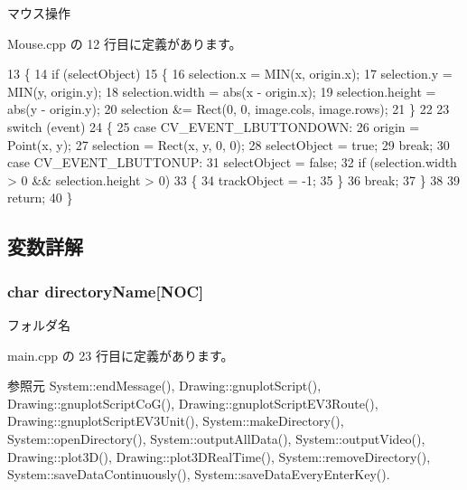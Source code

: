 マウス操作 



 Mouse.\-cpp の 12 行目に定義があります。


\begin{DoxyCode}
13 \{
14     \textcolor{keywordflow}{if} (selectObject)
15     \{
16         selection.x = MIN(x, origin.x);
17         selection.y = MIN(y, origin.y);
18         selection.width = abs(x - origin.x);
19         selection.height = abs(y - origin.y);
20         selection &= Rect(0, 0, image.cols, image.rows);
21     \}
22 
23     \textcolor{keywordflow}{switch} (event)
24     \{
25     \textcolor{keywordflow}{case} CV\_EVENT\_LBUTTONDOWN:
26         origin = Point(x, y);
27         selection = Rect(x, y, 0, 0);
28         selectObject = \textcolor{keyword}{true};
29         \textcolor{keywordflow}{break};
30     \textcolor{keywordflow}{case} CV\_EVENT\_LBUTTONUP:
31         selectObject = \textcolor{keyword}{false};
32         \textcolor{keywordflow}{if} (selection.width > 0 && selection.height > 0)
33         \{
34             trackObject = -1;
35         \}
36         \textcolor{keywordflow}{break};
37     \}
38 
39     \textcolor{keywordflow}{return};
40 \}\end{DoxyCode}


\subsection{変数詳解}
\subsubsection[{directory\-Name}]{\setlength{\rightskip}{0pt plus 5cm}char directory\-Name[{\bf N\-O\-C}]}\label{main_8cpp_abefb498e9a643f68bb3d37c22953ddad}


フォルダ名 



 main.\-cpp の 23 行目に定義があります。



参照元 System\-::end\-Message(), Drawing\-::gnuplot\-Script(), Drawing\-::gnuplot\-Script\-Co\-G(), Drawing\-::gnuplot\-Script\-E\-V3\-Route(), Drawing\-::gnuplot\-Script\-E\-V3\-Unit(), System\-::make\-Directory(), System\-::open\-Directory(), System\-::output\-All\-Data(), System\-::output\-Video(), Drawing\-::plot3\-D(), Drawing\-::plot3\-D\-Real\-Time(), System\-::remove\-Directory(), System\-::save\-Data\-Continuously(), System\-::save\-Data\-Every\-Enter\-Key().

